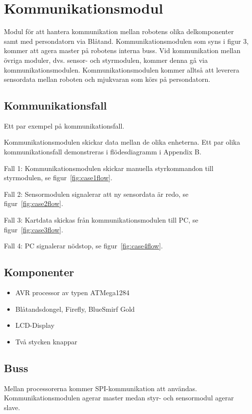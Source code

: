 \documentclass[a4paper,12pt,fleqn]{article}
\begin{document}


\section{Kommunikationsmodul}
Modul för att hantera kommunikation mellan robotens olika delkomponenter samt med persondatorn via Blåtand. Kommunikationsmodulen som syns i figur 3, kommer att agera master på robotens interna buss. Vid kommunikation mellan övriga moduler, dvs. sensor- och styrmodulen, kommer denna gå via kommunikationsmodulen.
Kommunikationsmodulen kommer alltså att leverera sensordata mellan roboten och mjukvaran som körs på persondatorn.

\subsection{Kommunikationsfall}
Ett par exempel på kom\-mun\-ikations\-fall.

Kommunikationsmodulen skickar data mellan de olika enheterna. Ett par olika kommunikationsfall demonstreras i flödesdiagramm i Appendix B.

Fall 1: Kommunikationsmodulen skickar manuella styrkommandon till styrmodulen, se figur~\ref{fig:case1flow}.

Fall 2: Sensormodulen signalerar att ny sensordata är redo, se  figur~\ref{fig:case2flow}.

Fall 3: Kartdata skickas från kommunikationsmodulen till PC, se figur~\ref{fig:case3flow}. 

Fall 4: PC signalerar nödstop, se figur~\ref{fig:case4flow}. 

 
\subsection{Komponenter}
\begin{itemize}
  \item AVR processor av typen ATMega1284
  \item Blåtandsdongel, Firefly, BlueSmirf Gold
  \item LCD-Display
  \item Två stycken knappar
\end{itemize}

\subsection{Buss}
Mellan processorerna kommer SPI-kommunikation att användas. Kommunikationsmodulen agerar master medan styr- och sensormodul agerar slave. 
\end{document}
